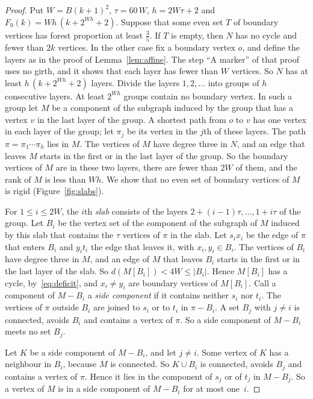 \begin{proof}
Put $W=B(k+1)^{2}$, $\tau=60\,W$, $h=2W\tau+2$ and $F_0(k)=Wh\,(k+2^{Wh}+2)$. Suppose that some
even set $T$ of boundary vertices has forest proportion at least $\frac35$. If $T$ is empty, then
$N$ has no cycle and fewer than $2k$ vertices. In the other case fix a boundary vertex $o$, and
define the layers as in the proof of Lemma~\ref{lem:affine}. The step ``A marker'' of that proof
uses no girth, and it shows that each layer has fewer than $W$ vertices. So $N$ has at least
$h\,(k+2^{Wh}+2)$ layers. Divide the layers $1,2,\dots$ into groups of $h$ consecutive layers. At
least $2^{Wh}$ groups contain no boundary vertex. In such a group let $M$ be a component of the
subgraph induced by the group that has a vertex $v$ in the last layer of the group. A shortest
path from $o$ to $v$ has one vertex in each layer of the group; let $\pi_j$ be its vertex in the
$j$th of these layers. The path $\pi=\pi_1\cdots\pi_h$ lies in $M$. The vertices of $M$ have
degree three in $N$, and an edge that leaves $M$ starts in the first or in the last layer of the
group. So the boundary vertices of $M$ are in these two layers, there are fewer than $2W$ of
them, and the rank of $M$ is less than $Wh$. We show that no even set of boundary vertices of
$M$ is rigid (Figure~\ref{fig:slabs}).

 For $1\le i\le2W$, the $i$th \emph{slab} consists of the layers
$2+(i-1)\tau,\dots,1+i\tau$ of the group. Let $B_i$ be the vertex set of the component of the
subgraph of $M$ induced by this slab that contains the $\tau$ vertices of $\pi$ in the slab. Let
$s_ix_i$ be the edge of $\pi$ that enters $B_i$ and $y_it_i$ the edge that leaves it, with
$x_i,y_i\in B_i$. The vertices of $B_i$ have degree three in $M$, and an edge of $M$ that leaves
$B_i$ starts in the first or in the last layer of the slab. So $d(M[B_i])<4W\le|B_i|$. Hence
$M[B_i]$ has a cycle, by~\eqref{eq:deficit}, and $x_i\ne y_i$ are boundary vertices of
$M[B_i]$. Call a component of $M-B_i$ a \emph{side component} if it contains neither $s_i$ nor
$t_i$. The vertices of $\pi$ outside $B_i$ are joined to $s_i$ or to $t_i$ in $\pi-B_i$. A set
$B_j$ with $j\ne i$ is connected, avoids $B_i$ and contains a vertex of $\pi$. So a side
component of $M-B_i$ meets no set $B_j$.

 Let $K$ be a side component of $M-B_i$, and let $j\ne i$. Some
vertex of $K$ has a neighbour in $B_i$, because $M$ is connected. So $K\cup B_i$ is connected,
avoids $B_j$ and contains a vertex of $\pi$. Hence it lies in the component of $s_j$ or of
$t_j$ in $M-B_j$. So a vertex of $M$ is in a side component of $M-B_i$ for at most one~$i$.


\end{proof}
